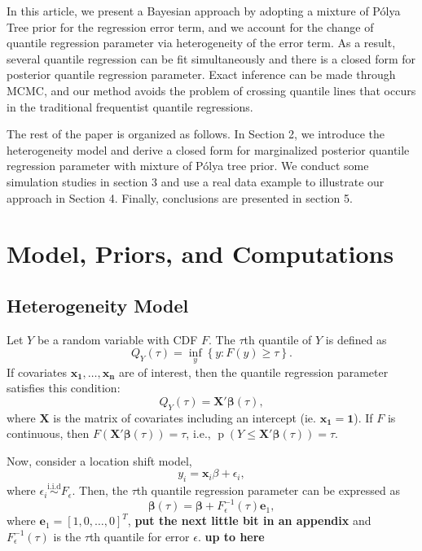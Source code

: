 \documentclass[12pt]{article}
\newcommand{\polya}{P\'{o}lya}
\DeclareMathOperator{\pr}{p}
\begin{document}
In this article, we present a Bayesian approach by adopting a mixture
of \polya{} Tree prior for the regression error term, and we account
for the change of quantile regression parameter via heterogeneity of
the error term. As a result, several quantile regression can be fit
simultaneously and there is a closed form for posterior quantile
regression parameter. Exact inference can be made through MCMC, and
our method avoids the problem of crossing quantile lines that occurs
in the traditional frequentist quantile regressions.

The rest of the paper is organized as follows. In Section 2, we
introduce the heterogeneity model and derive a closed form for
marginalized posterior quantile regression parameter with mixture of
\polya{} tree prior. We conduct some simulation studies in section 3
and use a real data example to illustrate our approach in Section
4. Finally, conclusions are presented in section 5.

\section{Model, Priors, and Computations}
\subsection{Heterogeneity Model}
Let $Y$ be a random variable with CDF $F$.  The $\tau$th quantile
of $Y$ is defined as
\begin{displaymath}
  Q_Y(\tau) = \underset{y}{\inf} \left\{ y: F(y) \ge \tau \right\}.
\end{displaymath}
If covariates $\bm{x_1, \ldots, x_n}$ are of interest,
then the quantile regression parameter satisfies this
condition:
\begin{displaymath}
  Q_Y(\tau) = \bm{X'\beta}(\tau),
\end{displaymath}
where $\bm{X}$ is the matrix of covariates including
an intercept (ie. $\bm{x_1}=
\bm{1}$).
If $F$ is continuous, then
$F(\bm{X'\beta}(\tau)) = \tau$, i.e., $\pr(Y \le \bm{X'\beta}(\tau)) =
\tau$.

Now, consider a location shift model,
\begin{displaymath}
  y_i = \bm{x}_i\beta + \epsilon_i,
\end{displaymath}
where $\epsilon_i \stackrel{\text{i.i.d}}{\sim} F_{\epsilon}$. Then, the $\tau$th
quantile regression parameter can be expressed as
\begin{equation}
  \label{eq:1}
  \bm{\beta}(\tau) = \bm{\beta} + F^{-1}_{\epsilon}(\tau) \bm{e}_1,
\end{equation}
where $\bm{e}_1 = [1, 0, \ldots, 0]^T$,  {\bf put the next little bit
  in an appendix} and $F^{-1}_{\epsilon}(\tau)$ is
the $\tau$th quantile for error $\epsilon$.
{\bf up to here}
\end{document}
